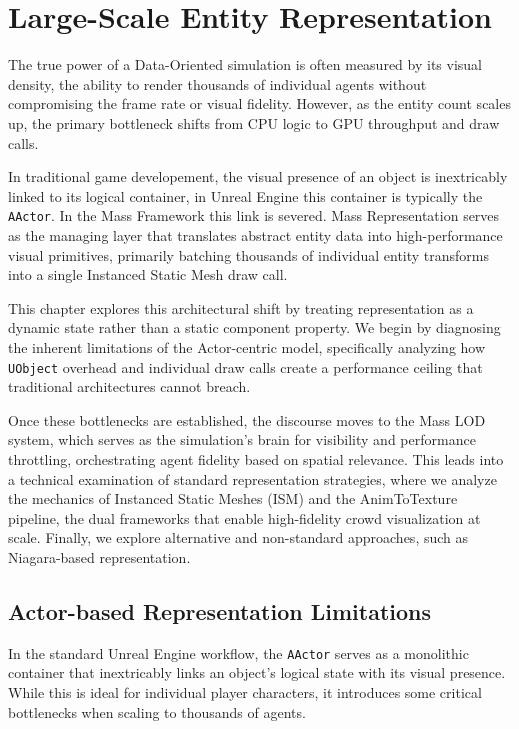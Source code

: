 \chapter{Large-Scale Entity Representation}
\label{sec:EntityRepresentation}

The true power of a Data-Oriented simulation is often measured by its visual density, the ability to render thousands of individual agents without compromising the frame rate or visual fidelity. However, as the entity count scales up, the primary bottleneck shifts from CPU logic to GPU throughput and draw calls.

In traditional game developement, the visual presence of an object is inextricably linked to its logical container, in Unreal Engine this container is typically the \texttt{AActor}. In the Mass Framework this link is severed. Mass Representation serves as the managing layer that translates abstract entity data into high-performance visual primitives, primarily batching thousands of individual entity transforms into a single Instanced Static Mesh draw call.

This chapter explores this architectural shift by treating representation as a dynamic state rather than a static component property. We begin by diagnosing the inherent limitations of the Actor-centric model, specifically analyzing how \texttt{UObject} overhead and individual draw calls create a performance ceiling that traditional architectures cannot breach.

Once these bottlenecks are established, the discourse moves to the Mass LOD system, which serves as the simulation’s brain for visibility and performance throttling, orchestrating agent fidelity based on spatial relevance. This leads into a technical examination of standard representation strategies, where we analyze the mechanics of Instanced Static Meshes (ISM) and the AnimToTexture pipeline, the dual frameworks that enable high-fidelity crowd visualization at scale. Finally, we explore alternative and non-standard approaches, such as Niagara-based representation.


\section[Actor-based Representation Limitations]{Actor-based Representation Limitations} %

In the standard Unreal Engine workflow, the \texttt{AActor} serves as a monolithic container that inextricably links an object's logical state with its visual presence. While this is ideal for individual player characters, it introduces some critical bottlenecks when scaling to thousands of agents.

